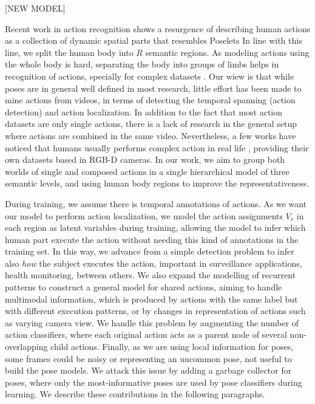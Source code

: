 [NEW MODEL]

Recent work in action recognition \cite{Cheron2015,Tao2015, Wang2011,Jhuang2013} shows a resurgence of describing human actions as a collection of dynamic spatial parts that resembles Poselets In line with this line, we split the human body into $R$ semantic regions. As modeling actions using the whole body is hard, separating the body into groups of limbs helps in recognition of actions, specially for complex datasets \cite{Tao2015}. Our wiew is that while poses are in general well defined in most research, little effort has been made to mine actions from videos, in terms of detecting the temporal spanning (action detection) and action localization. In addition to the fact that most action datasets are only single actions, there is a lack of research in the general setup where actions are combined in the same video. Nevertheless, a few works have noticed that humans usually performs complex action in real life \cite{Wei2013, Lillo2014}, providing their own datasets based in RGB-D cameras. In our work, we aim to group both worlds of single and composed actions in a single hierarchical model of three semantic levels, and using human body regions to improve the representativeness. 

During training, we assume there is temporal annotations of actions. As we want our model to perform action localization, we model the action assignments $V_r$ in each region as latent variables during training, allowing the model to infer which human part execute the action without needing this kind of annotations in the training set. In this way, we advance from a simple detection problem to infer also \emph{how} the subject executes the action, important in surveillance applications, health monitoring, between others. We also expand the modelling of recurrent patterns to construct a general model for shared actions, aiming to handle multimodal information, which is produced by actions with the same label but with different execution patterns, or by changes in representation of actions such as varying camera view. We handle this problem by augmenting the number of action classifiers, where each original action acts as a parent node of several non-overlapping child actions. Finally, as we are using local information for poses, some frames could be noisy or representing an uncommon pose, not useful to build the pose models. We attack this issue by adding a garbage collector for poses, where only the most-informative poses are used by pose classifiers during learning. We describe these contributions in the following paragraphs.

